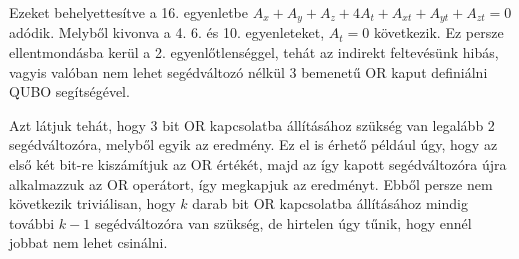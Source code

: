 Ezeket behelyettesítve a 16. egyenletbe $A_{x}+A_{y}+A_{z}+4A_{t}+A_{xt}+A_{yt}+A_{zt}=0$ adódik. Melyből kivonva a 4. 6. és 10. egyenleteket, $A_{t}=0$ következik. Ez persze ellentmondásba kerül a 2. egyenlőtlenséggel, tehát az indirekt feltevésünk hibás, vagyis valóban nem lehet segédváltozó nélkül 3 bemenetű OR kaput definiálni QUBO segítségével.

Azt látjuk tehát, hogy 3 bit OR kapcsolatba állításához szükség van legalább 2 segédváltozóra, melyből egyik az eredmény. Ez el is érhető például úgy, hogy az első két bit-re kiszámítjuk az OR értékét, majd az így kapott segédváltozóra újra alkalmazzuk az OR operátort, így megkapjuk az eredményt. Ebből persze nem következik triviálisan, hogy $k$ darab bit OR kapcsolatba állításához mindig további $k-1$ segédváltozóra van szükség, de hirtelen úgy tűnik, hogy ennél jobbat nem lehet csinálni.